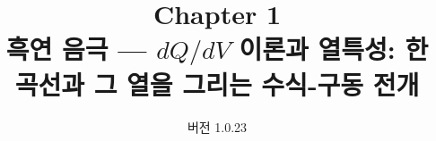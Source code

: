 
\renewcommand{\theequation}{1.\arabic{equation}}
\renewcommand{\thesection}{1.\arabic{section}}

\title{\textbf{\LARGE Chapter 1}\\[0.35em]\Large 흑연 음극 --- $dQ/dV$ 이론과 열특성: 한 곡선과 그 열을 그리는 수식-구동 전개}
\author{}
\date{\normalsize 버전 1.0.23}


\maketitle

































